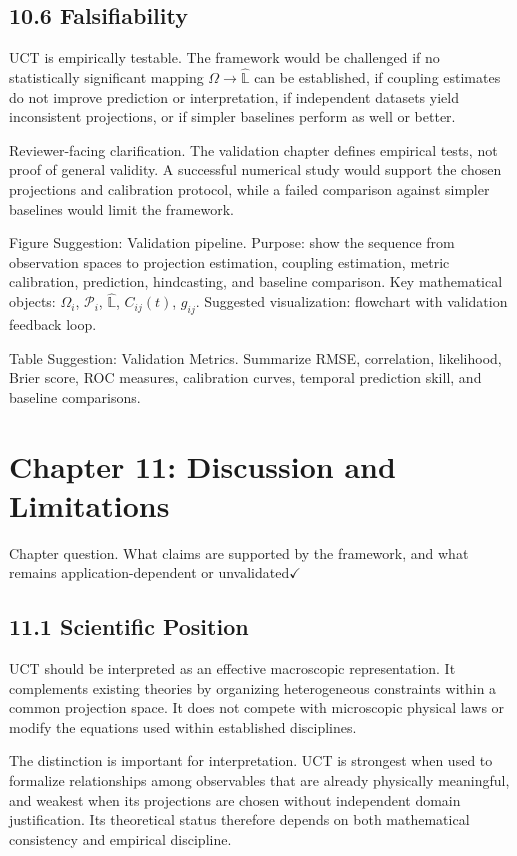 \documentclass[aps,pre,reprint,superscriptaddress,nofootinbib]{revtex4-2}
\begin{document}
\subsection{10.6 Falsifiability}

UCT is empirically testable. The framework would be challenged if no statistically significant mapping \(\Omega\rightarrow\hat{\mathbb{L}}\) can be established, if coupling estimates do not improve prediction or interpretation, if independent datasets yield inconsistent projections, or if simpler baselines perform as well or better.

Reviewer-facing clarification. The validation chapter defines empirical tests, not proof of general validity. A successful numerical study would support the chosen projections and calibration protocol, while a failed comparison against simpler baselines would limit the framework.

Figure Suggestion: Validation pipeline. Purpose: show the sequence from observation spaces to projection estimation, coupling estimation, metric calibration, prediction, hindcasting, and baseline comparison. Key mathematical objects: \(\Omega_i\), \(\mathcal{P}_i\), \(\hat{\mathbb{L}}\), \(C_{ij}(t)\), \(g_{ij}\). Suggested visualization: flowchart with validation feedback loop.

Table Suggestion: Validation Metrics. Summarize RMSE, correlation, likelihood, Brier score, ROC measures, calibration curves, temporal prediction skill, and baseline comparisons.

\section{Chapter 11: Discussion and Limitations}

Chapter question. What claims are supported by the framework, and what remains application-dependent or unvalidated$\checkmark$

\subsection{11.1 Scientific Position}

UCT should be interpreted as an effective macroscopic representation. It complements existing theories by organizing heterogeneous constraints within a common projection space. It does not compete with microscopic physical laws or modify the equations used within established disciplines.

The distinction is important for interpretation. UCT is strongest when used to formalize relationships among observables that are already physically meaningful, and weakest when its projections are chosen without independent domain justification. Its theoretical status therefore depends on both mathematical consistency and empirical discipline.
\end{document}
